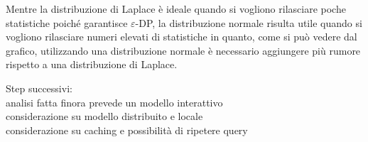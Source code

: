 Mentre la distribuzione di Laplace è ideale quando si vogliono rilasciare poche statistiche poiché garantisce $\varepsilon$-DP, la distribuzione normale risulta utile quando si vogliono rilasciare numeri elevati di statistiche in quanto, come si può vedere dal grafico, utilizzando una distribuzione normale è necessario aggiungere più rumore rispetto a una distribuzione di Laplace.





\newpage
Step successivi:\\
analisi fatta finora prevede un modello interattivo\\
considerazione su modello distribuito e locale\\
considerazione su caching e possibilità di ripetere query\\